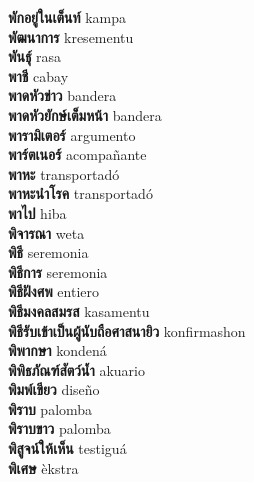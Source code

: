 \textbf{ พักอยู่ในเต็นท์  } kampa \\
\textbf{ พัฒนาการ  } kresementu \\
\textbf{ พันธุ์  } rasa \\
\textbf{ พาชี  } cabay \\
\textbf{ พาดหัวข่าว  } bandera \\
\textbf{ พาดหัวยักษ์เต็มหน้า  } bandera \\
\textbf{ พารามิเตอร์  } argumento \\
\textbf{ พาร์ตเนอร์  } acompañante \\
\textbf{ พาหะ  } transportadó \\
\textbf{ พาหะนำโรค  } transportadó \\
\textbf{ พาไป  } hiba \\
\textbf{ พิจารณา  } weta \\
\textbf{ พิธี  } seremonia \\
\textbf{ พิธีการ  } seremonia \\
\textbf{ พิธีฝังศพ  } entiero \\
\textbf{ พิธีมงคลสมรส  } kasamentu \\
\textbf{ พิธีรับเข้าเป็นผู้นับถือศาสนายิว  } konfirmashon \\
\textbf{ พิพากษา  } kondená \\
\textbf{ พิพิธภัณฑ์สัตว์น้ำ  } akuario \\
\textbf{ พิมพ์เขียว  } diseño \\
\textbf{ พิราบ  } palomba \\
\textbf{ พิราบขาว  } palomba \\
\textbf{ พิสูจน์ให้เห็น  } testiguá \\
\textbf{ พิเศษ  } èkstra \\
